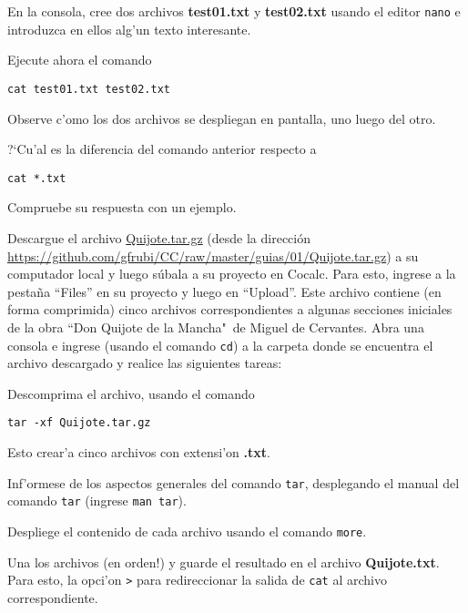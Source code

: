 \documentclass[11pt]{exam}
\begin{document}
\begin{questions}
\begin{parts}
\item En la consola, cree dos archivos \textbf{test01.txt} y \textbf{test02.txt} usando el editor \texttt{nano} e introduzca en ellos alg'un texto interesante.

\item Ejecute ahora el comando 

\begin{verbatim}
cat test01.txt test02.txt
\end{verbatim}

Observe c'omo los dos archivos se despliegan en pantalla, uno luego del otro.

\item ?`Cu'al es la diferencia del comando anterior respecto a 

\begin{verbatim}
cat *.txt
\end{verbatim}

Compruebe su respuesta con un ejemplo.
\end{parts}

\item Descargue el archivo \href{https://github.com/gfrubi/CC/raw/master/guias/01/Quijote.tar.gz}{Quijote.tar.gz} (desde la dirección \url{https://github.com/gfrubi/CC/raw/master/guias/01/Quijote.tar.gz}) a su computador local y luego súbala a su proyecto en Cocalc. Para esto, ingrese a la pestaña ``Files'' en su proyecto y luego en ``Upload''. Este archivo contiene (en forma comprimida) cinco archivos correspondientes a algunas secciones iniciales de la obra ``Don Quijote de la Mancha"\, de Miguel de Cervantes. Abra una consola e ingrese (usando el comando \texttt{cd}) a la carpeta donde se encuentra el archivo descargado y realice las siguientes tareas:
\begin{parts}
\item Descomprima el archivo, usando el comando 

\begin{verbatim}
tar -xf Quijote.tar.gz
\end{verbatim}

Esto crear'a cinco archivos con extensi'on \textbf{.txt}. 
\item Inf'ormese de los aspectos generales del comando \texttt{tar}, desplegando el manual del comando \texttt{tar} (ingrese \texttt{man tar}).
\item Despliege el contenido de cada archivo usando el comando \texttt{more}.
\item Una los archivos (en orden!) y guarde el resultado en el archivo \textbf{Quijote.txt}. Para esto, la opci'on \texttt{>} para redireccionar la salida de \texttt{cat} al archivo correspondiente.
\end{parts}


\end{questions}
\end{document}
